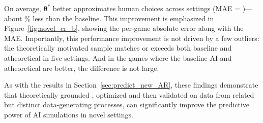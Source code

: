 On average, $\bm{\theta}^*$ better approximates human choices across settings (MAE = \CRTheoryNovelMAE)---about \CRPercImprove\% less than the baseline.
This improvement is emphasized in Figure~\ref{fig:novel_cr_b}, showing the per-game absolute error along with the MAE.
Importantly, this performance improvement is not driven by a few outliers: the theoretically motivated sample matches or exceeds both baseline and atheoretical  in five settings.
And in the games where the baseline AI and atheoretical  are better, the difference is not large.

As with the results in Section~\ref{sec:predict_new_AR}, these findings demonstrate that theoretically grounded , optimized and then validated on data from related but distinct data-generating processes, can significantly improve the predictive power of AI simulations in novel settings.



